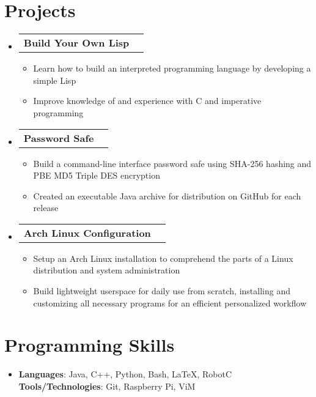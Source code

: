 \documentclass[letterpaper,11pt]{article}
\makeatletter
\newcommand{\resumeBullet}[1]
{\item\small
	{#1 \vspace{-2pt}
	}
}
\newcommand{\resumeSubheading}[1]
{\vspace{-4pt}\item
	\begin{tabular*}{0.97\textwidth}{l@{\extracolsep{\fill}}r}
		\textbf{#1} \\
	\end{tabular*}\vspace{-6pt}
}
\newcommand{\resumeSubHeadingListStart}{\begin{itemize}[leftmargin=*]}
\newcommand{\resumeSubHeadingListEnd}{\end{itemize}}
\newcommand{\resumeItemListStart}{\begin{itemize}}
\newcommand{\resumeItemListEnd}{\end{itemize}\vspace{-6pt}}
\makeatother
\begin{document}
\section{Projects}
  \resumeSubHeadingListStart
  	\resumeSubheading{Build Your Own Lisp}
  	\resumeItemListStart
		\resumeBullet
		{Learn how to build an interpreted programming language by developing a simple Lisp}
		\resumeBullet
		{Improve knowledge of and experience with C and imperative programming}
	\resumeItemListEnd
	\resumeSubheading{Password Safe}
	\resumeItemListStart
		\resumeBullet
		{Build a command-line interface password safe using SHA-256 hashing and PBE MD5 Triple DES encryption}
		\resumeBullet
		{Created an executable Java archive for distribution on GitHub for each release}
	\resumeItemListEnd
	\resumeSubheading{Arch Linux Configuration}
	\resumeItemListStart
		\resumeBullet
		{Setup an Arch Linux installation to comprehend the parts of a Linux distribution and system administration}
		\resumeBullet
		{Build lightweight userspace for daily use from scratch, installing and customizing all necessary programs for an efficient personalized workflow}
	\resumeItemListEnd
  \resumeSubHeadingListEnd


\section{Programming Skills}
  \resumeSubHeadingListStart
  	\item{
        \textbf{Languages}{: Java, C++, Python, Bash, LaTeX, RobotC}
	\hfill
      	\textbf{Tools/Technologies}{: Git, Raspberry Pi, ViM}   \begin{comment} 
      															Arduino 
     															\end{comment}
    }
  \resumeSubHeadingListEnd


\end{document}

